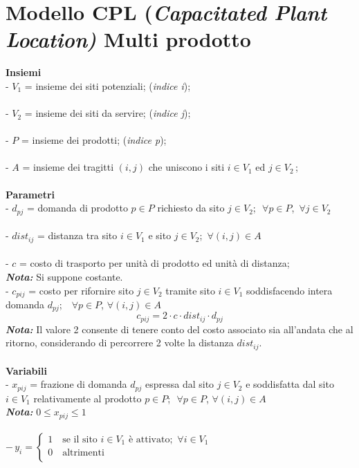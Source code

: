\documentclass[a4paper,12pt,titlepage]{article}
\begin{document}
\section*{Modello CPL (\textit{Capacitated Plant Location)} Multi prodotto}
\textbf{Insiemi}\\
- $V_1$ = insieme dei siti potenziali;\,\,(\textit{indice i});\\
\\
- $V_2$ = insieme dei siti da servire;\,\,(\textit{indice j});\\
\\
- $P$ = insieme dei prodotti;\,\,(\textit{indice p});\\
\\
- $A$ = insieme dei tragitti $(i,j)$ che uniscono i siti $i\in V_1$ ed $j\in V_2$\,;\\
\\
\textbf{Parametri}\\
- $d_{pj}$ = domanda di prodotto $p\in P$ richiesto da sito $j\in V_2$;\,\, $\forall p \in P$,\, $\forall j \in V_2$\\
\\
- $dist_{ij}$ = distanza tra sito $i\in V_1$ e sito $j\in V_2$;\,\,\,$\forall (i,j)\in A$\\
\\
- $c$ = costo di trasporto per unità di prodotto ed unità di distanza;\\
\textbf{\textit{Nota:}} Si suppone costante.\\
- $c_{pij}$ = costo per rifornire sito $j\in V_2$ tramite sito $i\in V_1$  soddisfacendo intera domanda $d_{pj}$; \,\, $\forall p \in P$,\,\,$\forall (i,j)\in A$\\
\begin{equation*}
	c_{pij} = 2\cdot c\cdot dist_{ij}\cdot d_{pj}
\end{equation*}
\textbf{\textit{Nota:}} Il valore 2 consente di tenere conto del costo associato sia all'andata che al ritorno, considerando di percorrere 2 volte la distanza $dist_{ij}$.\\
\\
\textbf{Variabili}\\
- $x_{pij}$ = frazione di domanda $d_{pj}$ espressa dal sito $j\in V_2$ e soddisfatta dal sito $i\in V_1$ relativamente al prodotto $p\in P$;\,\, $\forall p \in P$,\,\,$\forall (i,j)\in A$\\
\textbf{\textit{Nota:}} $0 \leq x_{pij}\leq 1$\\
\\
\[
-\,y_{i}=
\left\{
\begin{array}{ll}
1\quad\mbox{se il sito $i\in V_1$ è attivato};\,\,\forall i\in V_1 \qquad\qquad\qquad\qquad\qquad\qquad\qquad\qquad\qquad \\
0\quad\mbox{altrimenti}\\
\end{array}
\right.
\]
\end{document}
